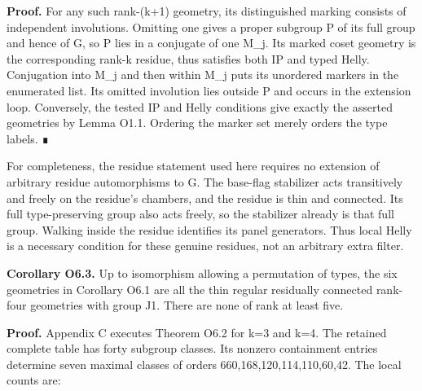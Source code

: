 \documentclass[
  10pt,
  letterpaper,
]{article}
\newcounter{none} %
\begin{document}
\textbf{Proof.} For any such rank-(k+1) geometry, its distinguished
marking consists of independent involutions. Omitting one gives a proper
subgroup P of its full group and hence of G, so P lies in a conjugate of
one M\_j. Its marked coset geometry is the corresponding rank-k residue,
thus satisfies both IP and typed Helly. Conjugation into M\_j and then
within M\_j puts its unordered markers in the enumerated list. Its
omitted involution lies outside P and occurs in the extension loop.
Conversely, the tested IP and Helly conditions give exactly the asserted
geometries by Lemma O1.1. Ordering the marker set merely orders the type
labels. ∎

For completeness, the residue statement used here requires no extension
of arbitrary residue automorphisms to G. The base-flag stabilizer acts
transitively and freely on the residue's chambers, and the residue is
thin and connected. Its full type-preserving group also acts freely, so
the stabilizer already is that full group. Walking inside the residue
identifies its panel generators. Thus local Helly is a necessary
condition for these genuine residues, not an arbitrary extra filter.

\textbf{Corollary O6.3.} Up to isomorphism allowing a permutation of
types, the six geometries in Corollary O6.1 are all the thin regular
residually connected rank-four geometries with group J1. There are none
of rank at least five.

\textbf{Proof.} Appendix C executes Theorem O6.2 for k=3 and k=4. The
retained complete table has forty subgroup classes. Its nonzero
containment entries determine seven maximal classes of orders
660,168,120,114,110,60,42. The local counts are:
\end{document}
